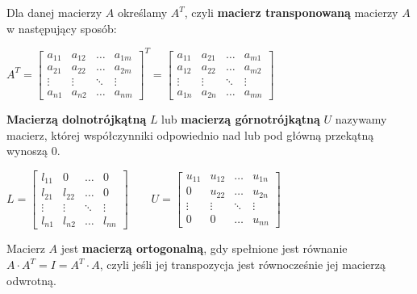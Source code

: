 \documentclass[11pt]{article}
\begin{document}
Dla danej macierzy $A$ określamy $A^{T}$, czyli \textbf{macierz transponowaną} macierzy $A$ w następujący sposób:
\begin{center}
\begin{math}
A^{T} = 
\begin{bmatrix}
    a_{11} & a_{12} & \dots  & a_{1m} \\
    a_{21} & a_{22} & \dots  & a_{2m} \\
    \vdots & \vdots & \ddots & \vdots \\
    a_{n1} & a_{n2} & \dots  & a_{nm}
\end{bmatrix}^{T}
=
\begin{bmatrix}
    a_{11} & a_{21} & \dots  & a_{m1} \\
    a_{12} & a_{22} & \dots  & a_{m2} \\
    \vdots & \vdots & \ddots & \vdots \\
    a_{1n} & a_{2n} & \dots  & a_{mn}
\end{bmatrix}
\end{math}
\end{center}

\textbf{Macierzą dolnotrójkątną} $L$ lub \textbf{macierzą górnotrójkątną} $U$ nazywamy macierz, której współczynniki odpowiednio nad lub pod główną przekątną wynoszą $0$.

\begin{center}
\begin{math}
L
=
\begin{bmatrix}
    l_{11} & 0  & \dots  & 0 \\
    l_{21} & l_{22} & \dots  & 0 \\
    \vdots & \vdots & \ddots & \vdots \\
    l_{n1} & l_{n2} & \dots  & l_{nn}
\end{bmatrix}
\hspace{2em} U = 
\begin{bmatrix}
    u_{11} & u_{12} & \dots  & u_{1n} \\
    0 & u_{22} & \dots  & u_{2n} \\
    \vdots & \vdots & \ddots & \vdots \\
    0 & 0 & \dots  & u_{nn}
\end{bmatrix}
\end{math}
\end{center}

Macierz $A$ jest \textbf{macierzą ortogonalną}, gdy spełnione jest równanie\\ $A \cdot A^{T} = I = A^{T} \cdot A$, czyli jeśli jej transpozycja jest równocześnie jej macierzą odwrotną.
\end{document}
